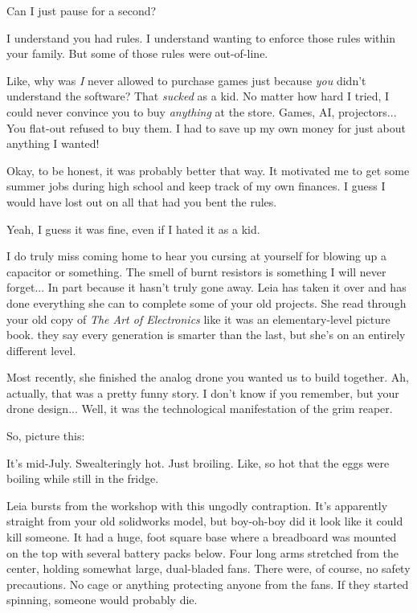 Can I just pause for a second?

I understand you had rules.
I understand wanting to enforce those rules within your family.
But some of those rules were out-of-line.

Like, why was \textit{I} never allowed to purchase games just because \textit{you} didn't understand the software?
That \textit{sucked} as a kid.
No matter how hard I tried, I could never convince you to buy \textit{anything} at the store.
Games, AI, projectors... You flat-out refused to buy them.
I had to save up my own money for just about anything I wanted!

Okay, to be honest, it was probably better that way.
It motivated me to get some summer jobs during high school and keep track of my own finances.
I guess I would have lost out on all that had you bent the rules.

Yeah, I guess it was fine, even if I hated it as a kid.

I do truly miss coming home to hear you cursing at yourself for blowing up a capacitor or something.
The smell of burnt resistors is something I will never forget... In part because it hasn't truly gone away.
Leia has taken it over and has done everything she can to complete some of your old projects.
She read through your old copy of \textit{The Art of Electronics} like it was an elementary-level picture book.
they say every generation is smarter than the last, but she's on an entirely different level.

Most recently, she finished the analog drone you wanted us to build together.
Ah, actually, that was a pretty funny story.
I don't know if you remember, but your drone design... Well, it was the technological manifestation of the grim reaper.

So, picture this: 

It's mid-July.
Swealteringly hot.
Just broiling.
Like, so hot that the eggs were boiling while still in the fridge.

Leia bursts from the workshop with this ungodly contraption.
It's apparently straight from your old solidworks model, but boy-oh-boy did it look like it could kill someone.
It had a huge, foot square base where a breadboard was mounted on the top with several battery packs below.
Four long arms stretched from the center, holding somewhat large, dual-bladed fans.
There were, of course, no safety precautions.
No cage or anything protecting anyone from the fans.
If they started spinning, someone would probably die.

